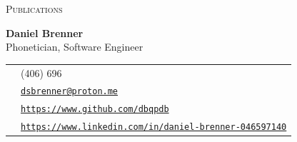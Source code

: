 \documentclass{article}
\begin{document}
\thispagestyle{empty}
\lfoot{}
\cfoot{}
\rfoot{}

\centerline{\large\textsc{Publications}}
\vspace{.5cm}
\noindent\Large\textbf{Daniel Brenner} \\
\large Phonetician, Software Engineer \\

\noindent
\begin{tabular}{c l}
	\faPhoneSquare* & (406) 696\textendash 7069 \\
	\faEnvelope & \href{mailto:dsbrenner@proton.me}{\texttt{dsbrenner@proton.me}} \\
	\faGithub & \href{https://www.github.com/dbqpdb}{\texttt{https://www.github.com/dbqpdb}} \\
	\faLinkedin & \href{https://www.linkedin.com/in/daniel-brenner-046597140}{\texttt{https://www.linkedin.com/in/daniel-brenner-046597140}}
\end{tabular}

\sectionspacing


\sectionspacing


\sectionspacing




\end{document}
